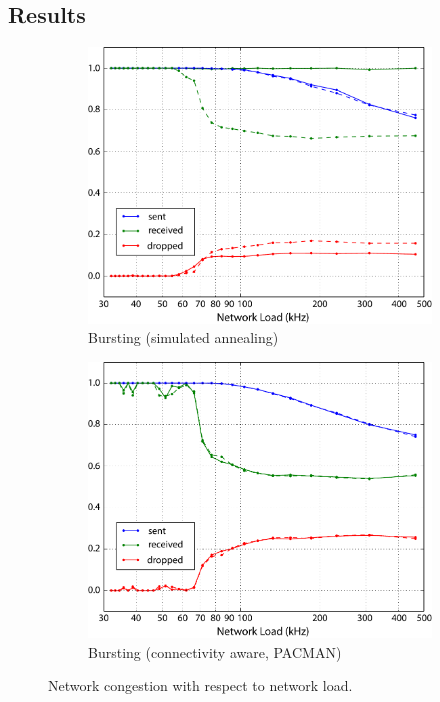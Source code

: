 \documentclass[a4paper, 11pt]{article}
\begin{document}
\subsection{Results}

\begin{figure}[b]
	\begin{subfigure}{.5\linewidth}
		\centering
		\includegraphics[width=0.9\linewidth]{images/bursting3.pdf}
		\caption{Bursting (simulated annealing)}
		\label{fig:bursting}
	\end{subfigure}
	\begin{subfigure}{.5\linewidth}
		\centering
		\includegraphics[width=0.9\linewidth]{images/bursting_connaware3.pdf}
		\caption{Bursting (connectivity aware, PACMAN)}	
		\label{fig:bursting_aware}
	\end{subfigure}
	\caption{Network congestion with respect to network load.}
	\label{fig:congestion}
\end{figure}
\end{document}
